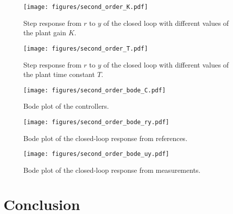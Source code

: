 \documentclass[letterpaper, 10 pt, conference]{ieeeconf}
\begin{document}
\begin{figure}[h]
	\centering
	\texttt{[image: figures/second\_order\_K.pdf]}
	\caption{Step response from $r$ to $y$ of the closed loop with different values of the plant gain $K$.}
	\label{fig:second_order_K}
\end{figure}
\begin{figure}[h]
	\centering
	\texttt{[image: figures/second\_order\_T.pdf]}
	\caption{Step response from $r$ to $y$ of the closed loop with different values of the plant time constant $T$.}
	\label{fig:second_order_T}
\end{figure}
\begin{figure}[h]
	\centering
	\texttt{[image: figures/second\_order\_bode\_C.pdf]}
	\caption{Bode plot of the controllers.}
	\label{fig:second_order_bode_C}
\end{figure}
\begin{figure}[h]
	\centering
	\texttt{[image: figures/second\_order\_bode\_ry.pdf]}
	\caption{Bode plot of the closed-loop response from references.}
	\label{fig:second_order_bode_ry}
\end{figure}
\begin{figure}[h]
	\centering
	\texttt{[image: figures/second\_order\_bode\_uy.pdf]}
	\caption{Bode plot of the closed-loop response from measurements.}
	\label{fig:second_order_bode_uy}
\end{figure}

\section{Conclusion}




\end{document}
